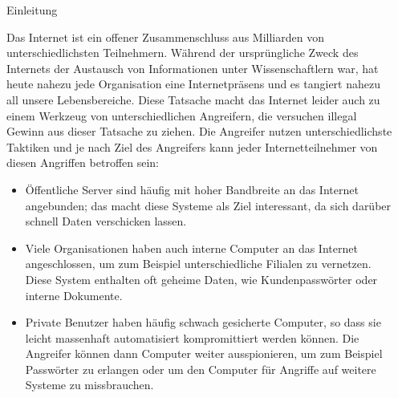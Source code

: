 \documentclass[final]{beamer}
\newlength{\sepwid}
\newlength{\twocolwid}
\begin{document}
\begin{frame}[t]
\begin{columns}[t, totalwidth=\textwidth]
\begin{column}{\sepwid}\end{column} %

\begin{column}{\twocolwid} %


\begin{block}{Einleitung}

Das Internet ist ein offener Zusammenschluss aus Milliarden von unterschiedlichsten
Teilnehmern. Während der ursprüngliche Zweck des Internets der Austausch von Informationen
unter Wissenschaftlern war, hat heute nahezu jede Organisation eine Internetpräsens und
es tangiert nahezu all unsere Lebensbereiche. Diese Tatsache macht das Internet leider auch
zu einem Werkzeug von unterschiedlichen Angreifern, die versuchen illegal Gewinn aus dieser
Tatsache zu ziehen.
Die Angreifer nutzen unterschiedlichste Taktiken und je nach Ziel des Angreifers kann jeder
Internetteilnehmer von diesen Angriffen betroffen sein:

\begin{itemize}
 \item Öffentliche Server sind häufig mit hoher Bandbreite an das Internet angebunden; das 
 macht diese Systeme als Ziel interessant, da sich darüber schnell Daten verschicken lassen.
 \item Viele Organisationen haben auch interne Computer an das Internet angeschlossen, um 
 zum Beispiel unterschiedliche Filialen zu vernetzen. Diese System enthalten oft geheime Daten, 
 wie Kundenpasswörter oder interne Dokumente.
 \item Private Benutzer haben häufig schwach gesicherte Computer, so dass sie leicht massenhaft
 automatisiert kompromittiert werden können. Die Angreifer können dann Computer weiter ausspionieren, 
 um zum Beispiel Passwörter zu erlangen oder um den Computer für Angriffe auf weitere Systeme 
 zu missbrauchen.
\end{itemize}

\end{block}



\end{column}
\end{columns}
\end{frame}
\end{document}
